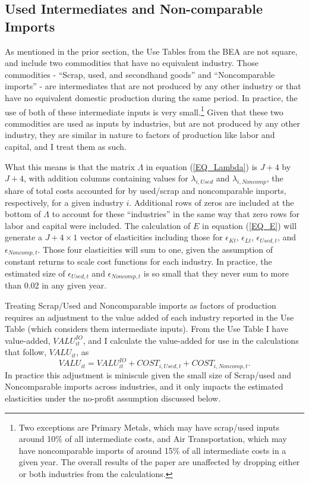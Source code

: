 \subsection{Used Intermediates and Non-comparable Imports}
As mentioned in the prior section, the Use Tables from the BEA are not square, and include two commodities that have no equivalent industry. Those commodities - ``Scrap, used, and secondhand goods'' and ``Noncomparable imports'' - are intermediates that are not produced by any other industry or that have no equivalent domestic production during the same period. In practice, the use of both of these intermediate inputs is very small.\footnote{Two exceptions are Primary Metals, which may have scrap/used inputs around 10\% of all intermediate costs, and Air Transportation, which may have noncomparable imports of around 15\% of all intermediate costs in a given year. The overall results of the paper are unaffected by dropping either or both industries from the calculations.} Given that these two commodities are used as inputs by industries, but are not produced by any other industry, they are similar in nature to factors of production like labor and capital, and I treat them as such.

What this means is that the matrix $\Lambda$ in equation (\ref{EQ_Lambda}) is $J+4$ by $J+4$, with addition columns containing values for $\lambda_{i,Used}$ and $\lambda_{i,Noncomp}$, the share of total costs accounted for by used/scrap and noncomparable imports, respectively, for a given industry $i$. Additional rows of zeros are included at the bottom of $\Lambda$ to account for these ``industries'' in the same way that zero rows for labor and capital were included. The calculation of $E$ in equation (\ref{EQ_E}) will generate a $J + 4 \times 1$ vector of elasticities including those for $\epsilon_{Kt}$, $\epsilon_{Lt}$, $\epsilon_{Used,t}$, and $\epsilon_{Noncomp,t}$. Those four elasticities will sum to one, given the assumption of constant returns to scale cost functions for each industry. In practice, the estimated size of $\epsilon_{Used,t}$ and $\epsilon_{Noncomp,t}$ is so small that they never sum to more than 0.02 in any given year.

Treating Scrap/Used and Noncomparable imports as factors of production requires an adjustment to the value added of each industry reported in the Use Table (which considers them intermediate inputs). From the Use Table I have value-added, $VALU_{it}^{IO}$, and I calculate the value-added for use in the calculations that follow, $VALU_{it}$, as 
\begin{equation}
  VALU_{it} = VALU_{it}^{IO} + COST_{i,Used,t} + COST_{i,Noncomp,t}.
\end{equation}
In practice this adjustment is miniscule given the small size of Scrap/used and Noncomparable imports across industries, and it only impacts the estimated elasticities under the no-profit assumption discussed below.


